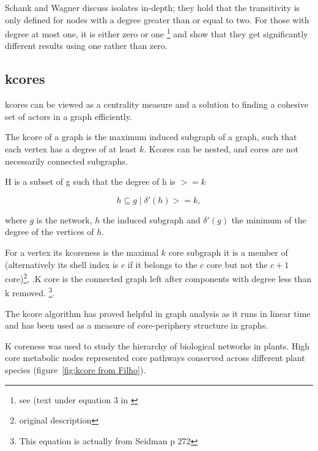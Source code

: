  Schank and Wagner\cite{schank2005approximating} discuss isolates in-depth; they hold that the transitivity is only defined for nodes with a degree greater than or equal to two. For those with degree at most one, it is either zero or one \footnote{see (text under equation 3 in \cite{schank2005approximating}} and show that they get significantly different results using one rather than zero. 

\subsection{kcores}

kcores can be viewed as a centrality measure and a solution to finding a cohesive set of actors in a graph efficiently.

The kcore of a graph is the maximum induced subgraph of a graph, such that each vertex has a degree of at least $k$. Kcores can be nested, and cores are not necessarily connected subgraphs\cite{batagelj2003m}. 

H is a subset of g such that the degree of h is $>=k$

\begin{equation}
h \subseteq g \mid \delta'(h)>=k,
\end{equation}

where $g$ is the network, $h$ the induced subgraph and  $\delta'(g)$ the minimum of the degree of the vertices of $h$\cite{seidman1983network}.

For a vertex its kcoreness is the maximal $k$ core subgraph it is a member of (alternatively its shell index is $c$ if it belongs to the $c$ core but not the $c+1$ core)\cite{seidman1983network}\footnote{original description}, \cite{alvarez2006large}.K core is the connected graph left after components with degree less than k removed.  \footnote{This equation is actually from Seidman p 272}\cite{seidman1983network}.

The kcore algorithm has proved helpful in graph analysis as it runs in linear time and has been used as a measure of core-periphery structure in graphs\cite{newman2018networks}. 

 K coreness was used to study the hierarchy of biological networks in plants. High core metabolic nodes represented core pathways conserved across different plant species\cite{filho2018hierarchical} (figure~\ref{fig:kcore from Filho}). 

